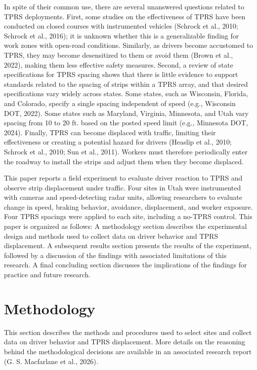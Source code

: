 \documentclass[
  letterpaper,
]{trb}
\begin{document}
In spite of their common use, there are several unanswered questions
related to TPRS deployments. First, some studies on the effectiveness of
TPRS have been conducted on closed courses with instrumented vehicles
(Schrock et al., 2010; Schrock et al., 2016); it is unknown whether this
is a generalizable finding for work zones with open-road conditions.
Similarly, as drivers become accustomed to TPRS, they may become
desensitized to them or avoid them (Brown et al., 2022), making them
less effective safety measures. Second, a review of state specifications
for TPRS spacing shows that there is little evidence to support
standards related to the spacing of strips within a TPRS array, and that
desired specifications vary widely across states. Some states, such as
Wisconsin, Florida, and Colorado, specify a single spacing independent
of speed (e.g., Wisconsin DOT, 2022). Some states such as Maryland,
Virginia, Minnesota, and Utah vary spacing from 10 to 20 ft. based on
the posted speed limit (e.g., Minnesota DOT, 2024). Finally, TPRS can
become displaced with traffic, limiting their effectiveness or creating
a potential hazard for drivers (Heaslip et al., 2010; Schrock et al.,
2010; Sun et al., 2011). Workers must therefore periodically enter the
roadway to install the strips and adjust them when they become
displaced.

This paper reports a field experiment to evaluate driver reaction to
TPRS and observe strip displacement under traffic. Four sites in Utah
were instrumented with cameras and speed-detecting radar units, allowing
researchers to evaluate change in speed, braking behavior, avoidance,
displacement, and worker exposure. Four TPRS spacings were applied to
each site, including a no-TPRS control. This paper is organized as
follows: A methodology section describes the experimental design and
methods used to collect data on driver behavior and TPRS displacement. A
subsequent results section presents the results of the experiment,
followed by a discussion of the findings with associated limitations of
this research. A final concluding section discusses the implications of
the findings for practice and future research.


\section{Methodology}\label{sec-methodology}

This section describes the methods and procedures used to select sites
and collect data on driver behavior and TPRS displacement. More details
on the reasoning behind the methodological decisions are available in an
associated research report (G. S. Macfarlane et al., 2026).
\end{document}
